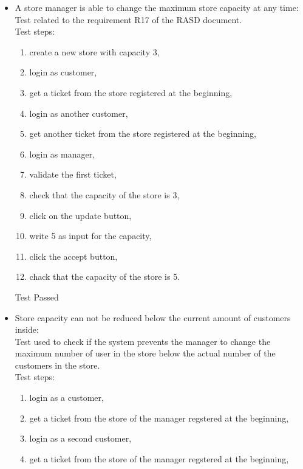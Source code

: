 \begin{itemize}
    \item A store manager is able to change the maximum store capacity at any time: \\
    Test related to the requirement R17 of the RASD document. \\
    Test steps: \\
    \begin{enumerate}
        \item create a new store with capacity 3,
        \item login as customer,
        \item get a ticket from the store registered at the beginning,
        \item login as another customer,
        \item get another ticket from the store registered at the beginning,
        \item login as manager,
        \item validate the first ticket,
        \item check that the capacity of the store is 3,
        \item click on the update button,
        \item write 5 as input for the capacity,
        \item click the accept button,
        \item chack that the capacity of the store is 5.
    \end{enumerate}
    Test Passed \\

    \item Store capacity can not be reduced below the current amount of customers inside: \\
    Test used to check if the system prevents the manager to change the maximum number of user in the store below the actual number of the customers in the store.\\
    Test steps:\\
    \begin{enumerate}
        \item login as a customer,

        \item get a ticket from the store of the manager regstered at the beginning,

        \item login as a second customer,

        \item get a ticket from the store of the manager regstered at the beginning,


\end{enumerate}
\end{itemize}
